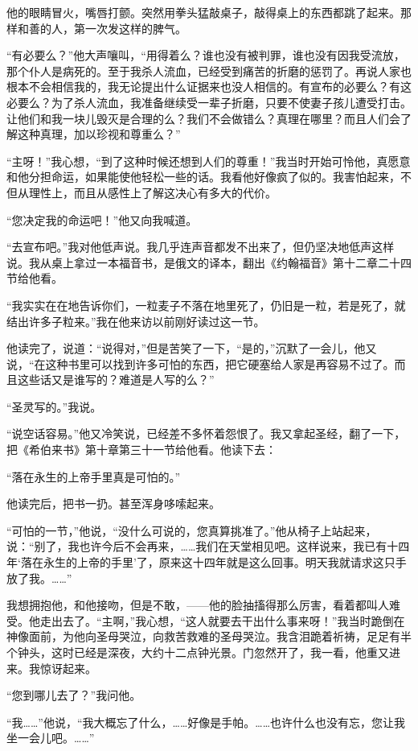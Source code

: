 \par 他的眼睛冒火，嘴唇打颤。突然用拳头猛敲桌子，敲得桌上的东西都跳了起来。那样和善的人，第一次发这样的脾气。
\par “有必要么？”他大声嚷叫，“用得着么？谁也没有被判罪，谁也没有因我受流放，那个仆人是病死的。至于我杀人流血，已经受到痛苦的折磨的惩罚了。再说人家也根本不会相信我的，我无论提出什么证据来也没人相信的。有宣布的必要么？有这必要么？为了杀人流血，我准备继续受一辈子折磨，只要不使妻子孩儿遭受打击。让他们和我一块儿毁灭是合理的么？我们不会做错么？真理在哪里？而且人们会了解这种真理，加以珍视和尊重么？”
\par “主呀！”我心想，“到了这种时候还想到人们的尊重！”我当时开始可怜他，真愿意和他分担命运，如果能使他轻松一些的话。我看他好像疯了似的。我害怕起来，不但从理性上，而且从感性上了解这决心有多大的代价。
\par “您决定我的命运吧！”他又向我喊道。
\par “去宣布吧。”我对他低声说。我几乎连声音都发不出来了，但仍坚决地低声这样说。我从桌上拿过一本福音书，是俄文的译本，翻出《约翰福音》第十二章二十四节给他看。
\par “我实实在在地告诉你们，一粒麦子不落在地里死了，仍旧是一粒，若是死了，就结出许多子粒来。”我在他来访以前刚好读过这一节。
\par 他读完了，说道：“说得对，”但是苦笑了一下，“是的，”沉默了一会儿，他又说，“在这种书里可以找到许多可怕的东西，把它硬塞给人家是再容易不过了。而且这些话又是谁写的？难道是人写的么？”
\par “圣灵写的。”我说。
\par “说空话容易。”他又冷笑说，已经差不多怀着怨恨了。我又拿起圣经，翻了一下，把《希伯来书》第十章第三十一节给他看。他读下去：
\par “落在永生的上帝手里真是可怕的。”
\par 他读完后，把书一扔。甚至浑身哆嗦起来。
\par “可怕的一节，”他说，“没什么可说的，您真算挑准了。”他从椅子上站起来，说：“别了，我也许今后不会再来，……我们在天堂相见吧。这样说来，我已有十四年‘落在永生的上帝的手里’了，原来这十四年就是这么回事。明天我就请求这只手放了我。……”
\par 我想拥抱他，和他接吻，但是不敢，——他的脸抽搐得那么厉害，看着都叫人难受。他走出去了。“主啊，”我心想，“这人就要去干出什么事来呀！”我当时跪倒在神像面前，为他向圣母哭泣，向救苦救难的圣母哭泣。我含泪跪着祈祷，足足有半个钟头，这时已经是深夜，大约十二点钟光景。门忽然开了，我一看，他重又进来。我惊讶起来。
\par “您到哪儿去了？”我问他。
\par “我……”他说，“我大概忘了什么，……好像是手帕。……也许什么也没有忘，您让我坐一会儿吧。……”

